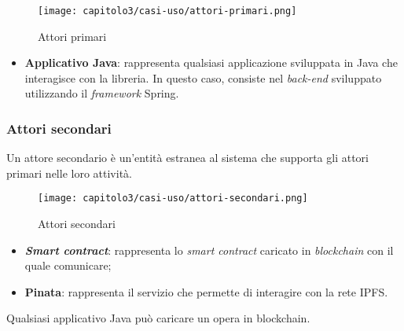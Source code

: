 \begin{figure}[h!]
  \centering
  \texttt{[image: capitolo3/casi-uso/attori-primari.png]}
  \caption{Attori primari}
\end{figure}

\begin{itemize}
  \item \textbf{Applicativo Java}: rappresenta qualsiasi applicazione sviluppata in Java che interagisce con la libreria. In questo caso, consiste nel \textit{back-end} sviluppato utilizzando il \textit{framework} Spring.
\end{itemize}

\subsubsection{Attori secondari}
Un attore secondario è un'entità estranea al sistema che supporta gli attori primari nelle loro attività.

\begin{figure}[h!]
  \centering
  \texttt{[image: capitolo3/casi-uso/attori-secondari.png]}
  \caption{Attori secondari}
\end{figure}

\begin{itemize}
  \item \textbf{\textit{Smart contract}}: rappresenta lo \textit{smart contract} caricato in \textit{blockchain} con il quale comunicare;
  \item \textbf{Pinata}: rappresenta il servizio che permette di interagire con la rete IPFS.
\end{itemize}

Qualsiasi applicativo Java può caricare un opera in blockchain.

